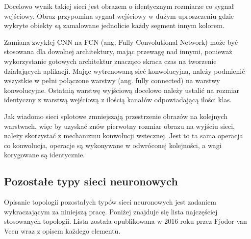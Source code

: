 \documentclass[12pt,a4paper,twoside,titlepage,openright]{book}
\begin{document}
Docelowo wynik takiej sieci jest obrazem o identycznym rozmiarze co sygnał wejściowy. Obraz przypomina sygnał wejściowy w dużym uproszczeniu gdzie wykryte obiekty są zamalowane jednolicie każdy segment innym kolorem.

Zamiana zwykłej CNN na FCN (ang. Fully Convolutional Network) może być stosowana dla dowolnej architektury, mając przewagę nad innymi, ponieważ wykorzystanie gotowych architektur znacząco skraca czas na tworzenie działających aplikacji. Mając wytrenowaną sieć konwolucyjną, należy podmienić wszystkie w pełni połączone warstwy (ang. fully connected) na warstwy konwolucyjne. Ostatnią warstwę wyjściową docelowo należy ustalić na rozmiar identyczny z warstwą wejściową z ilością kanałów odpowiadającą ilości klas.

Jak wiadomo sieci splotowe zmniejszają przestrzenie obrazów na kolejnych warstwach, więc by uzyskać znów pierwotny rozmiar obrazu na wyjściu sieci, należy skorzystać z mechanizmu konwolucji wstecznej. Jest to ta sama operacja co konwolucja, operacje są wykonywane w odwróconej kolejności, a wagi korygowane są identycznie.\cite{DBLP:journals/corr/LongSD14}

\subsection{Pozostałe typy sieci neuronowych}
Opisanie topologii pozostałych typów sieci neuronowych jest zadaniem wykraczającym za niniejszą pracę. Poniżej znajduje się lista najczęściej stosowanych topologii. Lista została opublikowana w 2016 roku przez Fjodor van Veen wraz z opisem każdego elementu.\cite{siteFjodorList}
\end{document}
